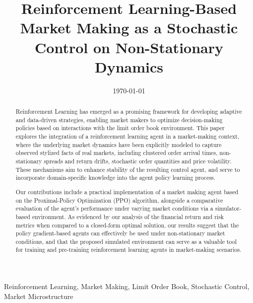 \title{Reinforcement Learning-Based Market Making as a Stochastic Control on Non-Stationary Dynamics}

\author{
    \and
}

\date{\today}

\maketitle

\begin{abstract}
    Reinforcement Learning has emerged as a promising framework for developing adaptive and data-driven strategies,
    enabling market makers to optimize decision-making policies based on interactions with the limit order book environment.
    This paper explores the integration of a reinforcement learning agent in a market-making context,
    where the underlying market dynamics have been explicitly modeled to capture observed stylized facts of real markets,
    including clustered order arrival times, non-stationary spreads and return drifts, stochastic order quantities and price volatility.
    These mechanisms aim to enhance stability of the resulting control agent,
    and serve to incorporate domain-specific knowledge into the agent policy learning process.

    Our contributions include a practical implementation of a market making agent based on the Proximal-Policy Optimization (PPO) algorithm,
    alongside a comparative evaluation of the agent's performance under varying market conditions via a simulator-based environment.
    As evidenced by our analysis of the financial return and risk metrics when compared to a closed-form optimal solution,
    our results suggest that the policy gradient-based agents can effectively be used under non-stationary market conditions,
    and that the proposed simulated environment can serve as a valuable tool for training and
    pre-training reinforcement learning agents in market-making scenarios.
\end{abstract}

\begin{IEEEkeywords}
    Reinforcement Learning, Market Making, Limit Order Book, Stochastic Control, Market Microstructure
\end{IEEEkeywords}
